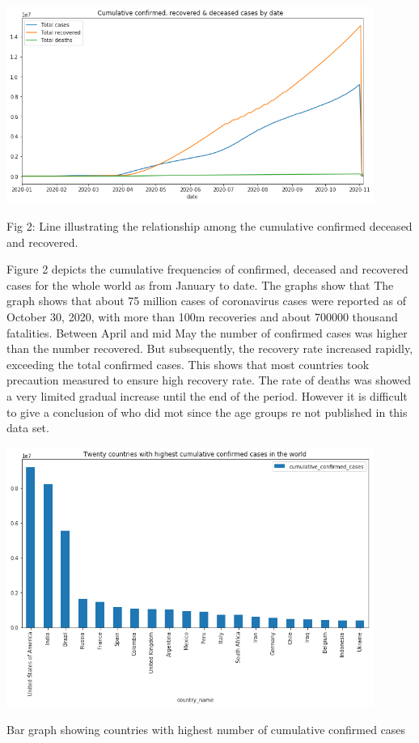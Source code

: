 \documentclass[12pt]{article}
\begin{document}
\includegraphics[width=0.9\textwidth, inner]{line2.png}
\caption{Fig 2: Line illustrating the relationship among the cumulative confirmed deceased and recovered.}

Figure 2 depicts the cumulative frequencies of confirmed, deceased and recovered cases for the whole world as from January to date.  The graphs show that
The graph shows that about 75 million cases of coronavirus cases were reported as of October 30, 2020, with more than 100m recoveries and about 700000 thousand fatalities. Between April and mid May the number of confirmed  cases was higher than the number recovered. But subsequently, the recovery rate increased rapidly, exceeding the total confirmed cases. This shows that most countries took precaution measured to ensure high recovery rate. The rate of deaths was showed a very limited gradual increase until the end of the period. However it is difficult to give a conclusion of who did mot since the age groups re not published in this data set.  

\includegraphics[width=0.9\textwidth, inner]{bar1.png}
\caption{Bar graph showing countries with highest number of cumulative confirmed cases}
\end{document}

